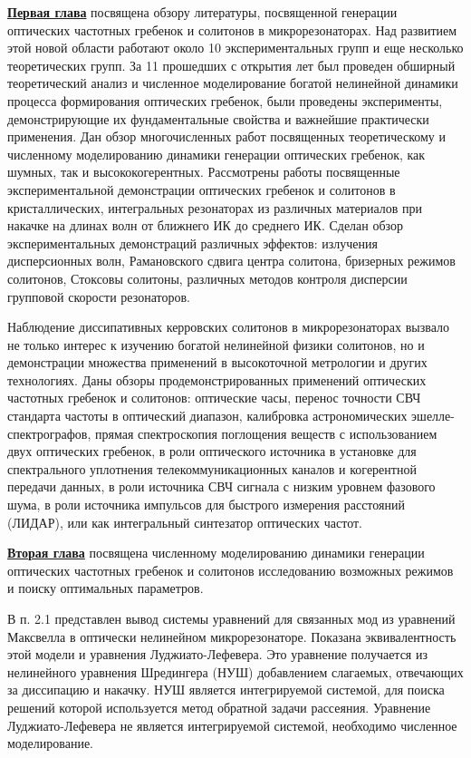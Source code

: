 \underline{\textbf{Первая глава}} посвящена обзору литературы, посвященной генерации оптических частотных гребенок и солитонов в микрорезонаторах. Над развитием этой новой области работают около 10 экспериментальных групп и еще несколько теоретических групп. За 11 прошедших с открытия лет был проведен обширный теоретический анализ и численное моделирование богатой нелинейной динамики процесса формирования оптических гребенок, были проведены эксперименты, демонстрирующие их фундаментальные свойства и важнейшие практически применения. Дан обзор многочисленных работ посвященных теоретическому и численному моделированию динамики генерации оптических гребенок, как шумных, так и высококогерентных. Рассмотрены работы посвященные экспериментальной демонстрации оптических гребенок и солитонов в кристаллических, интегральных резонаторах из различных материалов при накачке на длинах волн от ближнего ИК до среднего ИК. Сделан обзор экспериментальных демонстраций различных эффектов: излучения дисперсионных волн, Рамановского сдвига центра солитона, бризерных режимов солитонов, Стоксовы солитоны, различных методов контроля дисперсии групповой скорости резонаторов.

Наблюдение диссипативных керровских солитонов в микрорезонаторах вызвало не только интерес к изучению богатой нелинейной физики солитонов, но и демонстрации множества применений в высокоточной метрологии и других технологиях. Даны обзоры продемонстрированных применений оптических частотных гребенок и солитонов: оптические часы, перенос точности СВЧ стандарта частоты в оптический диапазон, калибровка астрономических эшелле-спектрографов, прямая спектроскопия поглощения веществ с использованием двух оптических гребенок, в роли оптического источника в установке для спектрального уплотнения телекоммуникационных каналов и когерентной передачи данных, в роли источника СВЧ сигнала с низким уровнем фазового шума, в роли источника импульсов для быстрого измерения расстояний (ЛИДАР), или как интегральный синтезатор оптических частот.

\underline{\textbf{Вторая глава}} посвящена численному моделированию динамики генерации оптических частотных гребенок и солитонов исследованию возможных режимов и поиску оптимальных параметров.

В п. 2.1 представлен вывод системы уравнений для связанных мод из уравнений Максвелла в оптически нелинейном микрорезонаторе. Показана эквивалентность этой модели и уравнения Луджиато-Лефевера. Это уравнение получается из нелинейного уравнения Шредингера (НУШ) добавлением слагаемых, отвечающих за диссипацию и накачку. НУШ является интегрируемой системой, для поиска решений которой используется метод обратной задачи рассеяния. Уравнение Луджиато-Лефевера не является интегрируемой системой, необходимо численное моделирование.

